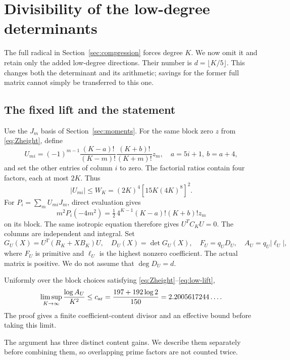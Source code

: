 \section{Divisibility of the low-degree determinants}\label{sec:content}
The full radical in Section~\ref{sec:compression} forces degree $K$.
We now omit it and retain only the added low-degree directions. Their
number is $d=\lfloor K/5\rfloor$. This changes both the determinant and
its arithmetic; savings for the former full matrix cannot simply be
transferred to this one.

\subsection{The fixed lift and the statement}
Use the $J_m$ basis of Section~\ref{sec:moments}. For the same block
zero $z$ from \eqref{eq:Zheight}, define
\begin{equation}\label{eq:low-lift}
 U_{mi}=(-1)^{m-1}
 \frac{(K-a)!}{(K-m)!}\frac{(K+b)!}{(K+m)!}z_m,
 \quad a=5i+1,\ b=a+4,
\end{equation}
and set the other entries of column $i$ to zero. The factorial ratios
contain four factors, each at most $2K$. Thus
\begin{equation}\label{eq:Wlow}
 |U_{mi}|\leq W_K=(2K)^4[15K(4K)^8]^2.
\end{equation}
For $P_i=\sum_mU_{mi}J_m$, direct evaluation gives
\[
 m^2P_i(-4m^2)=\tfrac12\,4^{K-1}(K-a)!(K+b)!z_m
\]
on its block. The same isotropic equation therefore gives $U^TC_KU=0$.
The columns are independent and integral. Set
\[
 G_U(X)=U^T(R_K+XB_K)U,\quad D_U(X)=\det G_U(X),
 \quad F_U=q_UD_U,\quad A_U=q_U|\ell_U|,
\]
where $F_U$ is primitive and $\ell_U$ is the highest nonzero coefficient.
The actual matrix is positive. We do not assume that $\deg D_U=d$.

\begin{theorem}\label{thm:content}
Uniformly over the block choices satisfying
\eqref{eq:Zheight}--\eqref{eq:low-lift},
\begin{equation}\label{eq:arith-rate}
 \limsup_{K\to\infty}\frac{\log A_U}{K^2}
 \leq c_{\rm ar}=\frac{197+192\log2}{150}
 =2.2005617244\ldots.
\end{equation}
The proof gives a finite coefficient-content divisor and an effective
bound before taking this limit.
\end{theorem}
The argument has three distinct content gains. We describe them
separately before combining them, so overlapping prime factors are
not counted twice.

